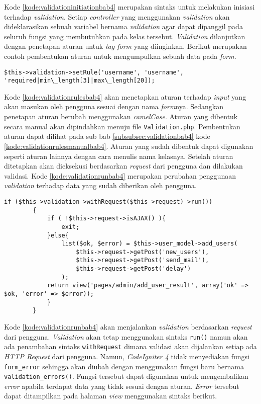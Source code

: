 Kode \ref{kode:validationinitiationbab4} merupakan sintaks untuk melakukan inisiasi terhadap \textit{validation}. Setiap \textit{controller} yang menggunakan \textit{validation} akan dideklarasikan sebuah variabel bernama \textit{validation} agar dapat dipanggil pada seluruh fungsi yang membutuhkan pada kelas tersebut. \textit{Validation} dilanjutkan dengan penetapan aturan untuk \textit{tag form} yang diinginkan. Berikut merupakan contoh pembentukan aturan untuk mengumpulkan sebuah data pada \textit{form}.

\begin{lstlisting}[caption=Perancangan perubahan konfigurasi aturan pada \textit{library validation}, label=kode:validationrulesbab4]
$this->validation->setRule('username', 'username', 'required|min\_length[3]|max\_length[20]);
\end{lstlisting}

Kode \ref{kode:validationrulesbab4} akan menetapkan aturan terhadap \textit{input} yang akan masukan oleh pengguna sesuai dengan nama \textit{form}nya. Sedangkan penetapan aturan berubah menggunakan \textit{camelCase}. Aturan yang dibentuk secara manual akan dipindahkan menuju file \texttt{Validation.php}. Pembentukan aturan dapat dilihat pada sub bab \ref{subsubsec:validationbab4} kode \ref{kode:validationrulesmanualbab4}. Aturan yang sudah dibentuk dapat digunakan seperti aturan lainnya dengan cara menulis nama kelasnya. Setelah aturan ditetapkan akan dieksekusi berdasarkan \textit{request} dari pengguna dan dilakukan validasi. Kode \ref{kode:validationrunbab4} merupakan perubahan penggunaan \textit{validation} terhadap data yang sudah diberikan oleh pengguna.
\begin{lstlisting}[caption=Perancangan perubahan penggunaan \textit{validation} pada \textit{CodeIgniter 4}, label=kode:validationrunbab4]
if ($this->validation->withRequest($this->request)->run())
		{
			if ( !$this->request->isAJAX() ){
				exit;
			}else{
				list($ok, $error) = $this->user_model->add_users(
					$this->request->getPost('new_users'),
					$this->request->getPost('send_mail'),
					$this->request->getPost('delay')
				);
			return view('pages/admin/add_user_result', array('ok' => $ok, 'error' => $error));
			}
		}
\end{lstlisting}

Kode \ref{kode:validationrunbab4} akan menjalankan \textit{validation} berdasarkan \textit{request} dari pengguna. \textit{Validation} akan tetap menggunakan sintaks \texttt{run()} namun akan ada penambahan sintaks \texttt{withRequest} dimana validasi akan dijalankan setiap ada \textit{HTTP Request} dari pengguna. Namun, \textit{CodeIgniter 4} tidak menyediakan fungsi \texttt{form\_error} sehingga akan diubah dengan menggunakan fungsi baru bernama \texttt{validation\_errors()}. Fungsi tersebut dapat digunakan untuk mengembalikan \textit{error} apabila terdapat data yang tidak sesuai dengan aturan. \textit{Error} tersebut dapat ditampilkan pada halaman \textit{view} menggunakan sintaks berikut.

